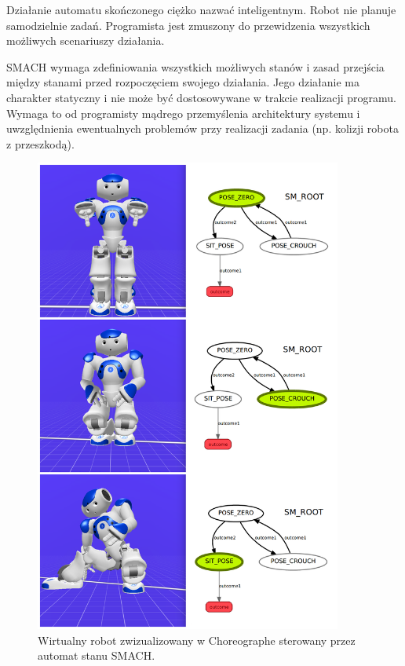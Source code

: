 Działanie automatu skończonego ciężko nazwać inteligentnym. Robot nie planuje samodzielnie zadań. Programista jest zmuszony do przewidzenia wszystkich możliwych scenariuszy działania. 

SMACH wymaga zdefiniowania wszystkich możliwych stanów i zasad przejścia między stanami przed rozpoczęciem swojego działania. Jego działanie ma charakter statyczny i nie może być dostosowywane w trakcie realizacji programu. Wymaga to od programisty mądrego przemyślenia architektury systemu i uwzględnienia ewentualnych problemów przy realizacji zadania (np. kolizji robota z przeszkodą). 


\begin{figure}
\centering
\includegraphics[width=0.90\textwidth]{images/NaoSmachPoses.png}
\caption{Wirtualny robot zwizualizowany w Choreographe sterowany przez automat stanu SMACH.}
\end{figure}



